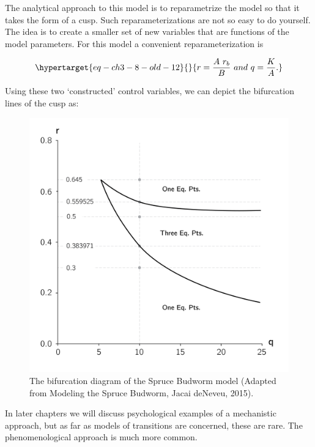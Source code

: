 \documentclass[
  a4paper,
  DIV=11,
  numbers=noendperiod,
  oneside]{scrreprt}
\begin{document}
The analytical approach to this model is to reparametrize the model so
that it takes the form of a cusp. Such reparameterizations are not so
easy to do yourself. The idea is to create a smaller set of new
variables that are functions of the model parameters. For this model a
convenient reparameterization is

\begin{equation}\protect\hypertarget{eq-ch3-8-old-12}{}{
r = \frac{A\ r_{b}}{B}\ and\ q = \frac{K}{A}.
}\label{eq-ch3-8-old-12}\end{equation}

Using these two `constructed' control variables, we can depict the
bifurcation lines of the cusp as:

\begin{figure}

{\centering \includegraphics{media/ch3/ch3-16__figure28.png}

}

\caption{\label{fig-ch3-img16-old-28}The bifurcation diagram of the
Spruce Budworm model (Adapted from Modeling the Spruce Budworm, Jacai
deNeveu, 2015).}

\end{figure}

In later chapters we will discuss psychological examples of a
mechanistic approach, but as far as models of transitions are concerned,
these are rare. The phenomenological approach is much more common.
\end{document}
